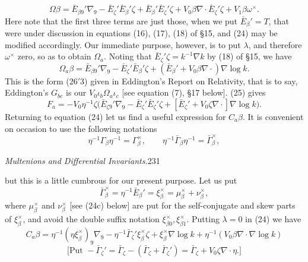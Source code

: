 \documentclass[11pt]{article}
\begin{document}
\begin{equation}\Omega\beta=\bar E_{\beta9}'\nabla_9-\bar E_\zeta'\bar E_\beta'\zeta+\bar E_\beta'\bar E_\zeta'\zeta+V_0\beta\nabla\mathbin{\cdot}\bar E_\zeta'\zeta+V_1\beta\omega^\times.\tag{24}\end{equation}
Here note that the first three terms are just those, when we put $\bar E_\beta'=T$, that were under discussion in equations (16), (17), (18) of \S15, and (24) may be modified accordingly. Our immediate purpose, however, is to put $\lambda$, and therefore $\omega^\times$ zero, so as to obtain $\Omega_a$. Noting that $\bar E_\zeta'\zeta=k^{-1}\nabla k$ by (18) of \S15, we have
\begin{equation}\Omega_a\beta=\bar E_{\beta9}'\nabla_9-\bar E_\zeta'\bar E_\beta'\zeta+(\bar E_\beta'+V_0\beta\nabla\mathbin{\cdot})\nabla\log k.\tag{25}\end{equation}
This is the form (26$'$3) given in Eddington's Report on Relativity, that is to say, Eddington's $G_{bc}$ is our $V_0\iota_b\Omega_a\iota_c$ [see equation (7), \S17 below]. (25) gives
\begin{equation}F_a=-V_0\eta^{-1}\zeta\bigl(\bar E_{\zeta9}'\nabla_9-\bar E_\zeta'\bar E_\zeta'\zeta+[\bar E_\zeta'+V_0\zeta\nabla\mathbin{\cdot}]\nabla\log k\bigr).\tag{26}\end{equation}
\indent Returning to equation (24) let us find a useful expression for $C_a\beta$. It is convenient on occasion to use the following notations
\[
\eta^{-1}\Gamma_\beta\eta^{-1}=\Gamma_\beta^\times,\qquad \eta^{-1}\bar\Gamma_\beta\eta^{-1}=\bar\Gamma_\beta^\times,
\]
\newpage\thispagestyle{empty}\begin{center}\textit{Multenions and Differential Invariants.}\hfill 231\end{center}
but this is a little cumbrous for our present purpose. Let us put
\begin{equation}\bar\Gamma_\beta^\times=\eta^{-1}\bar E_\beta'=\xi_\beta^\times=\mu_\beta^\times+\nu_\beta^\times,\tag{24a}\end{equation}
where $\mu_\beta^\times$ and $\nu_\beta^\times$ [see (24c) below] are put for the self-conjugate and skew parts of $\xi_\beta^\times$, and avoid the double suffix notation $\xi_{\beta0}^\times,\xi_{\beta1}^\times$. Putting $\lambda=0$ in (24) we have
\[
C_a\beta=\eta^{-1}(\eta\xi_\beta^\times)_9\nabla_9-\eta^{-1}\bar\Gamma_\zeta'\xi_\beta^\times\zeta+\xi_\beta^\times\nabla\log k+\eta^{-1}(V_0\beta\nabla\mathbin{\cdot}\nabla\log k)
\]
\[
\text{[Put }-\bar\Gamma_\zeta'=\bar\Gamma_\zeta-(\bar\Gamma_\zeta+\bar\Gamma_\zeta')=\bar\Gamma_\zeta+V_0\zeta\nabla\mathbin{\cdot}\eta\text{.]}
\]
\end{document}
